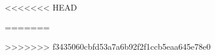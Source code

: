 \documentclass[11pt]{standalone}
\newlength\figureheight
\newlength\figurewidth
\begin{document}
\centering
\setlength{} 
\setlength{}
<<<<<<< HEAD

=======

>>>>>>> f3435060cbfd53a7a6b92f2f1ccb5eaa645e78e0
\end{document}
